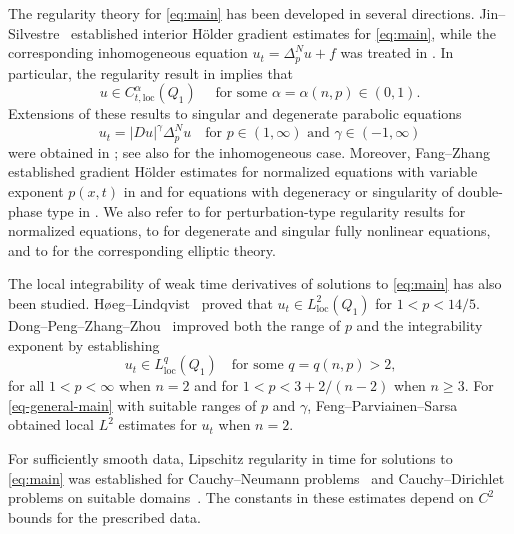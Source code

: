 \documentclass[a4paper,11pt]{amsart}
\theoremstyle{plain}
\theoremstyle{definition}
\numberwithin{equation}{section}
\begin{document}
The regularity theory for \eqref{eq:main} has been developed in several directions. Jin--Silvestre~\cite{JS17} established interior H\"older gradient estimates for \eqref{eq:main}, while the corresponding inhomogeneous equation $u_t=\Delta_p^Nu+f$ was treated in \cite{ABM23, AP18}. In particular, the regularity result in \cite{JS17} implies that
\begin{equation*}
    u \in C_{t, \mathrm{loc}}^{\alpha}(Q_1) \quad \text{ for some $\alpha=\alpha(n, p)\in(0,1)$.}
\end{equation*}
Extensions of these results to singular and degenerate parabolic equations 
\begin{equation}\label{eq-general-main}
    u_t=|Du|^{\gamma}\Delta_p^Nu \quad \text{for $p \in (1, \infty)$ and $\gamma \in (-1, \infty)$}
\end{equation}
were obtained in \cite{IJS19}; see also \cite{Att20,AR20} for the inhomogeneous case. Moreover, Fang--Zhang established gradient H\"older estimates for normalized equations with variable exponent $p(x,t)$ in \cite{FZ21} and for equations with degeneracy or singularity of double-phase type in \cite{FZ23}. We also refer to \cite{AS22,LY24} for perturbation-type regularity results for normalized equations, to \cite{LLY24} for degenerate and singular fully nonlinear equations, and to \cite{APR17,BM20} for the corresponding elliptic theory. 

The local integrability of weak time derivatives of solutions to \eqref{eq:main} has also been studied. H{\o}eg--Lindqvist~\cite{HL20} proved that $u_t\in L^2_{\mathrm{loc}}(Q_1)$ for $1<p<14/5$. Dong--Peng--Zhang--Zhou~\cite{DPZZ20} improved both the range of $p$ and the integrability exponent by establishing 
\begin{equation*}
u_t\in L^q_{\mathrm{loc}}(Q_1) \quad \text{for some $q=q(n,p)>2$,}    
\end{equation*}
for all $1<p<\infty$ when $n=2$ and for $1<p<3+2/(n-2)$ when $n\geq3$. For \eqref{eq-general-main} with suitable ranges of $p$ and $\gamma$, Feng--Parviainen--Sarsa~\cite{FPS23,FPS25} obtained local $L^2$ estimates for $u_t$ when $n=2$. 

For sufficiently smooth data, Lipschitz regularity in time for solutions to \eqref{eq:main} was established for Cauchy--Neumann problems~\cite[Theorem~4.1]{Doe11} and Cauchy--Dirichlet problems on suitable domains~\cite{BG13, BG15}. The constants in these estimates depend on $C^2$ bounds for the prescribed data.

\medskip
\end{document}

